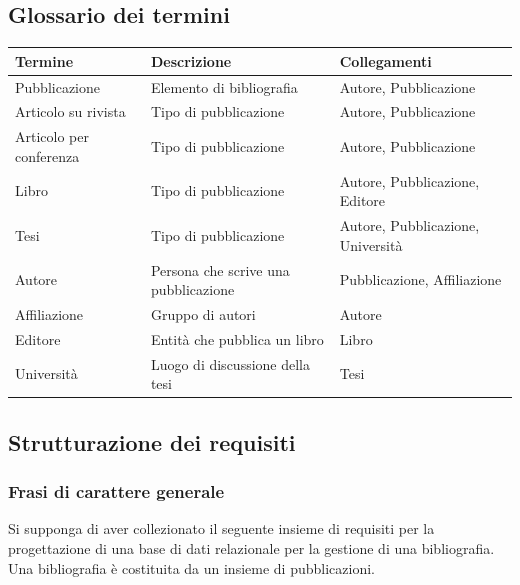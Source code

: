 \documentclass[a4paper,12pt]{article}
\begin{document}
\subsection{Glossario dei termini}
\label{sec:glossario}
\begin{tabularx}{\textwidth}{l X X}
\toprule
\textbf{Termine} & \textbf{Descrizione} & \textbf{Collegamenti} \\
\midrule
Pubblicazione & Elemento di bibliografia & Autore, Pubblicazione \\
Articolo su rivista & Tipo di pubblicazione & Autore, Pubblicazione \\
Articolo per conferenza & Tipo di pubblicazione & Autore, Pubblicazione \\
Libro & Tipo di pubblicazione & Autore, Pubblicazione, Editore \\
Tesi & Tipo di pubblicazione & Autore, Pubblicazione, Università \\
Autore & Persona che scrive una pubblicazione & Pubblicazione, Affiliazione \\
Affiliazione & Gruppo di autori & Autore \\
Editore & Entità che pubblica un libro & Libro \\
Università & Luogo di discussione della tesi & Tesi \\
\bottomrule
\end{tabularx}

\subsection{Strutturazione dei requisiti}
\label{sec:strutturazione}
\subsubsection{Frasi di carattere generale}
Si supponga di aver collezionato il seguente insieme di requisiti per la progettazione di una base di dati relazionale per la gestione di una bibliografia. Una bibliografia è costituita da un insieme di pubblicazioni.
\end{document}
